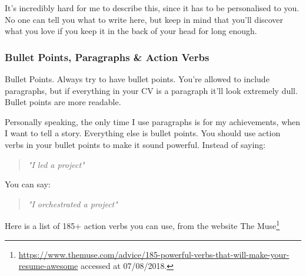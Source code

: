 \documentclass{article}
\begin{document}
It's incredibly hard for me to describe this, since it has to be
personalised to you. No one can tell you what to write here, but keep in
mind that you'll discover what you love if you keep it in the back of
your head for long enough.

\subsubsection{Bullet Points, Paragraphs \& Action Verbs}
Bullet Points. Always try to have bullet points. You're allowed to
include paragraphs, but if everything in your CV is a paragraph it'll
look extremely dull. Bullet points are more readable.

Personally speaking, the only time I use paragraphs is for my
achievements, when I want to tell a story. Everything else is bullet
points. You should use action verbs in your bullet points to make it
sound powerful. Instead of saying:
\begin{quote}
\emph{"I led a project"}
\end{quote}

You can say:

\begin{quote}
\emph{"I orchestrated a project"}
\end{quote}
Here is a list of 185+ action verbs you can use, from the website The
Muse\footnote{\href{https://www.themuse.com/advice/185-powerful-verbs-that-will-make-your-resume-awesome}{{https://www.themuse.com/advice/185-powerful-verbs-that-will-make-your-resume-awesome}}
  accessed at 07/08/2018.}
  
\end{document}
